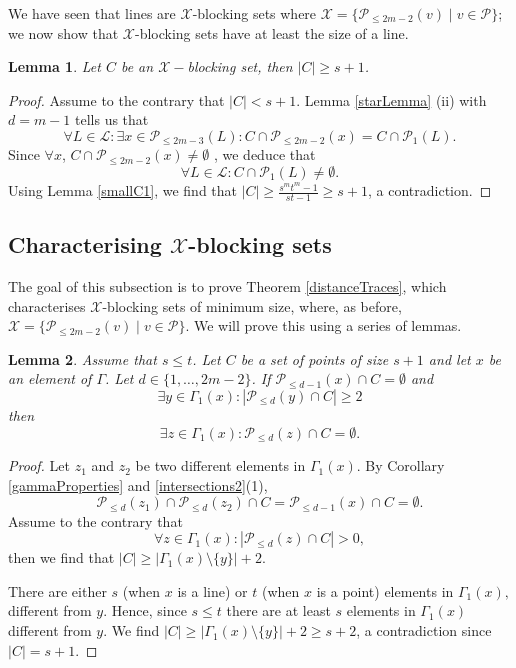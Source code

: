 \documentclass[12pt]{article}
\newcommand{\Points}{\mathcal{P}}
\newcommand{\Lines}{\mathcal{L}}
\newtheorem{lemma}{Lemma}
\theoremstyle{remark}
\begin{document}
We have seen that lines are $\mathcal{X}$-blocking sets where $\mathcal{X}=\{\mathcal{P}_{\leq 2m-2}(v)\mid v \in \Points\}$; we now show that $\mathcal{X}$-blocking sets have at least the size of a line.



\begin{lemma}\label{smallC}
	Let \(C\) be an $\mathcal{X}-$blocking set,
	then \(|C|\ge s+1\).
\end{lemma}
\begin{proof}
	Assume to the contrary that \(|C|<s+1\). 
	Lemma \ref{starLemma} (ii) with \(d=m-1\) tells us that 
	\[\forall L \in \Lines: \exists x \in \Points_{\le 2m-3}(L):   C\cap \Points_{\le2m-2}(x)=C\cap \Points_{1}(L) .\]
	Since $\forall x$, $C\cap \Points_{\le 2m-2}(x)\neq\emptyset$ , we deduce that
	\[\forall L \in \Lines: C\cap \Points_{1}(L)\neq \emptyset.\]
	Using Lemma \ref{smallC1}, we find that $|C|\geq \frac{s^mt^m-1}{st-1}\geq s+1$, a contradiction.
\end{proof}



\subsection{\texorpdfstring{Characterising $\mathcal{X}$-blocking sets}{Characterising X-blocking sets}}\label{subsection:characterisation}
The goal of this subsection is to prove Theorem \ref{distanceTraces}, which characterises $\mathcal{X}$-blocking sets of minimum size, where, as before, $\mathcal{X}=\{\mathcal{P}_{\leq 2m-2}(v)\mid v \in \Points\}$. We will prove this using a series of lemmas.
\begin{lemma}\label{exists0} Assume that $s\leq t$. Let \(C\) be a set of points of size \(s+1\) and let \(x\) be an element of \(\Gamma\). Let \(d\in\{1,\dots,2m-2\}\).
	If \(\Points_{\le d-1}(x)\cap C = \emptyset\) and 
	\[\exists y \in \Gamma_1(x): |\Points_{\le d}(y)\cap C| \ge 2\] then
	\[\exists z \in \Gamma_1(x): \Points_{\le d}(z)\cap C = \emptyset. \]
\end{lemma}
\begin{proof}


	Let \(z_1\) and \(z_2\) be two different elements in \( \Gamma_1(x)\).
	By Corollary  \ref{gammaProperties} and \ref{intersections2}(1),
	\[\Points_{\le d}(z_1) \cap \Points_{\le d}(z_2)\cap C = \Points_{\le d-1}(x) \cap C= \emptyset.\] 
	Assume to the contrary that 
	\[\forall z \in \Gamma_1(x): |\Points_{\le d}(z)\cap C| > 0, \]
then we find that \(|C|\ge |\Gamma_1(x)\setminus\{y\}| + 2 \).

There are either $s$ (when $x$ is a line) or $t$ (when $x$ is a point) elements in $\Gamma_1(x),$ different from $y$. 
    Hence, since  \(s\le t\) there are at least \(s\) elements in \(\Gamma_1(x)\) different from \(y\). 
	We find \(|C|\ge |\Gamma_1(x)\setminus\{y\}| + 2 \ge s+2\), a contradiction since $|C|=s+1$.
\end{proof}
\end{document}
